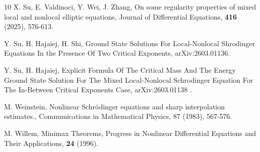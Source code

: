 \documentclass[12pt,a4paper,reqno]{amsart}
\numberwithin{equation}{section}
\begin{document}
\begin{thebibliography}{10}
X. Su, E. Valdinoci, Y. Wei, J. Zhang,
On some regularity properties of mixed local and nonlocal elliptic equations,
Journal of Differential Equations, \textbf{416} (2025), 576-613.

Y. Su, H. Hajaiej, H. Shi,
Ground State Solutions For Local-Nonlocal Shrodinger Equations In the Presence Of Two Critical Exponents,
arXiv:2603.01136.

Y. Su, H. Hajaiej,
Explicit Formula Of The Critical Mass And The Energy Ground State Solution For The Mixed Local-Nonlocal Schrodinger Equation For The In-Between Critical Exponents Case,
	arXiv:2603.01138 .


M. Weinstein,
Nonlinear Schr\"{o}dinger equations and sharp interpolation estimates.,
Communications in Mathematical Physics,
87 (1983), 567-576.

M. Willem,
Minimax Theorems,
Progress in Nonlinear Differential Equations and Their Applications,
\textbf{24} (1996).




\end{thebibliography}
\end{document}

